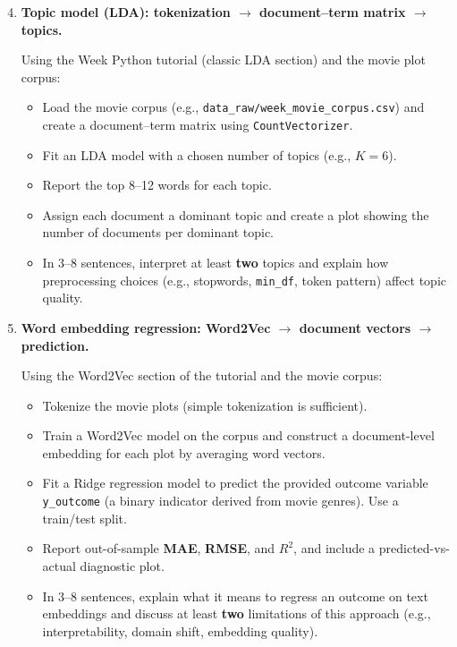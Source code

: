 \documentclass[11pt]{article}
\begin{document}
\begin{enumerate}
\setcounter{enumi}{3}

\item \textbf{Topic model (LDA): tokenization $\rightarrow$ document--term matrix $\rightarrow$ topics.}

Using the Week Python tutorial (classic LDA section) and the movie plot corpus:

\begin{itemize}
  \item Load the movie corpus (e.g., \texttt{data\_raw/week\_movie\_corpus.csv}) and create a document--term matrix using \texttt{CountVectorizer}.
  \item Fit an LDA model with a chosen number of topics (e.g., $K=6$).
  \item Report the top 8--12 words for each topic.
  \item Assign each document a dominant topic and create a plot showing the number of documents per dominant topic.
  \item In 3--8 sentences, interpret at least \textbf{two} topics and explain how preprocessing choices (e.g., stopwords, \texttt{min\_df}, token pattern) affect topic quality.
\end{itemize}

\item \textbf{Word embedding regression: Word2Vec $\rightarrow$ document vectors $\rightarrow$ prediction.}

Using the Word2Vec section of the tutorial and the movie corpus:

\begin{itemize}
  \item Tokenize the movie plots (simple tokenization is sufficient).
  \item Train a Word2Vec model on the corpus and construct a document-level embedding for each plot by averaging word vectors.
  \item Fit a Ridge regression model to predict the provided outcome variable \texttt{y\_outcome} (a binary indicator derived from movie genres). Use a train/test split.
  \item Report out-of-sample \textbf{MAE}, \textbf{RMSE}, and $R^2$, and include a predicted-vs-actual diagnostic plot.
  \item In 3--8 sentences, explain what it means to regress an outcome on text embeddings and discuss at least \textbf{two} limitations of this approach (e.g., interpretability, domain shift, embedding quality).
\end{itemize}


\end{enumerate}
\end{document}
